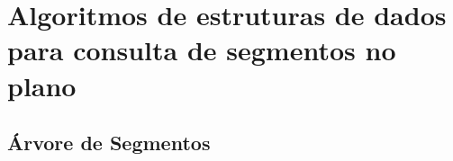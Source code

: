\chapter{Algoritmos de estruturas de dados para consulta de segmentos no plano}
\section{Árvore de Segmentos}